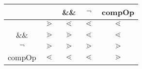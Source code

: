 \begin{tabular}{c | c c c c}
	 & \textbar{}\textbar{} & \&\& & $\neg{}$ & compOp \\
	\hline
	\textbar{}\textbar{} & $\gtrdot{}$ & $\lessdot{}$ & $\lessdot{}$ & $\lessdot{}$ \\
	\&\& & $\gtrdot{}$ & $\gtrdot{}$ & $\lessdot{}$ & $\lessdot{}$ \\
	$\neg{}$ & $\gtrdot{}$ & $\gtrdot{}$ & $\gtrdot{}$ & $\gtrdot{}$ \\
	compOp & $\lessdot{}$ & $\lessdot{}$ & $\lessdot{}$ & $\gtrdot{}$
\end{tabular}